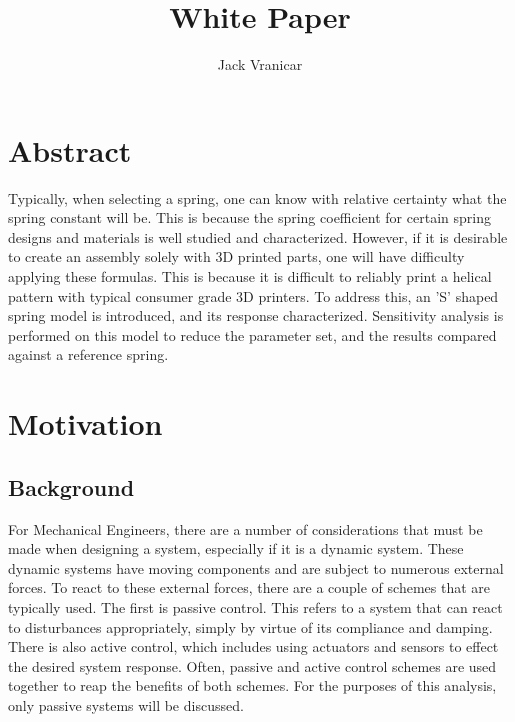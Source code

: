 \documentclass[conference]{article}
\title{\LARGE \bf
White Paper
}
\author{
    Jack Vranicar
}
\begin{document}
\maketitle

\thispagestyle{empty}
\pagestyle{empty}

\section{Abstract}

Typically, when selecting a spring, one can know with relative certainty what the spring constant will be. This is because the spring coefficient for certain spring designs and materials is well studied and characterized. However, if it is desirable to create an assembly solely with 3D printed parts, one will have difficulty applying these formulas. This is because it is difficult to reliably print a helical pattern with typical consumer grade 3D printers. To address this, an 'S' shaped spring model is introduced, and its response characterized. Sensitivity analysis is performed on this model to reduce the parameter set, and the results compared against a reference spring.
\section{Motivation}

\subsection{Background}

For Mechanical Engineers, there are a number of considerations that must be made when designing a system, especially if it is a dynamic system. These dynamic systems have moving components and are subject to numerous external forces. To react to these external forces, there are a couple of schemes that are typically used. The first is passive control. This refers to a system that can react to disturbances appropriately, simply by virtue of its compliance and damping. There is also active control, which includes using actuators and sensors to effect the desired system response. Often, passive and active control schemes are used together to reap the benefits of both schemes. For the purposes of this analysis, only passive systems will be discussed.
\end{document}
